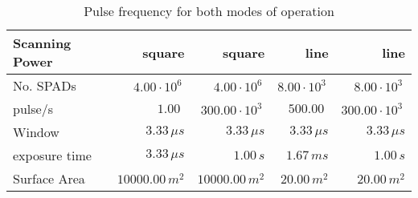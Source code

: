 \begin{table}[H]
\centering
\caption{Pulse frequency for both modes of operation}
\label{tab:scanning_power}
\begin{tabular}{|l|rrrr|}\hline
    \textbf{Scanning Power} & square & square & line & line \\
    \hline 
    No. SPADs & $4.00\cdot10^6\,$ & $4.00\cdot10^6\,$ & $8.00\cdot10^3\,$ & $8.00\cdot10^3\,$ \\
    pulse/s & $1.00\,\,$ & $300.00\cdot10^3\,$ & $500.00\,\,$ & $300.00\cdot10^3\,$ \\
    Window & $3.33\,\mu s$ & $3.33\,\mu s$ & $3.33\,\mu s$ & $3.33\,\mu s$ \\
    exposure time & $3.33\,\mu s$ & $1.00\, s$ & $1.67\,m s$ & $1.00\, s$ \\
    Surface Area & $10000.00\, m^2$ & $10000.00\, m^2$ & $20.00\, m^2$ & $20.00\, m^2$ \\
    \hline 
\end{tabular}
\end{table}
